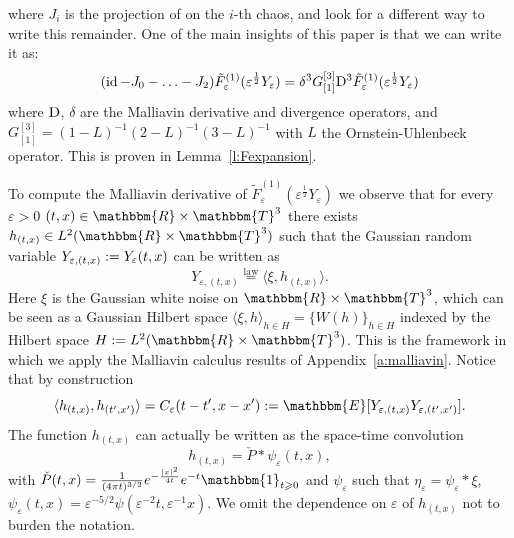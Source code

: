 where $J_i$ is the projection of on the $i$-th chaos, and look for a different
way to write this remainder. One of the main insights of this paper is that we
can write it as:
\[ (\operatorname{id} - J_0 - \ldots - J_2) \tilde{F}^{(1)}_{\varepsilon}
   (\varepsilon^{\frac{1}{2}} Y_{\varepsilon}) = \delta^3 G_{[1]}^{[3]}
   \mathrm{D}^3  \tilde{F}^{(1)}_{\varepsilon} (\varepsilon^{\frac{1}{2}}
   Y_{\varepsilon}) \]
where $\mathrm{D}$, $\delta$ are the Malliavin derivative and divergence
operators, and $G_{[1]}^{[3]} = (1 - L)^{- 1} (2 - L)^{- 1} (3 - L)^{- 1}$
with $L$ the Ornstein-Uhlenbeck operator. This is proven in
Lemma~\ref{l:Fexpansion}.

To compute the Malliavin derivative of $\tilde{F}^{(1)}_{\varepsilon}
(\varepsilon^{\frac{1}{2}} Y_{\varepsilon})$ we observe that for every
$\varepsilon > 0$ $(t, x) \in \mathbbm{R} \times \mathbbm{T}^3$ there exists
$h_{(t, x)} \in L^2 (\mathbbm{R} \times \mathbbm{T}^3)$ such that the Gaussian
random variable $Y_{\varepsilon, (t, x)} := Y_{\varepsilon} (t, x)$ can
be written as
\begin{equation}
  Y_{\varepsilon, (t, x)} \overset{\text{law}}{=} \langle \xi, h_{(t, x)}
  \rangle . \label{e:Y-law-equiv}
\end{equation}
Here $\xi$ is the Gaussian white noise on $\mathbbm{R} \times \mathbbm{T}^3$,
which can be seen as a Gaussian Hilbert space $\langle \xi, h \rangle_{h \in
H} = \{ W (h) \}_{h \in H}$ indexed by the Hilbert space $H \assign L^2
(\mathbbm{R} \times \mathbbm{T}^3)$. This is the framework in which we apply
the Malliavin calculus results of Appendix~\ref{a:malliavin}. Notice that by
construction
\begin{equation}
  \langle h_{(t, x)}, h_{(t', x')} \rangle = C_{\varepsilon} (t - t', x - x')
  \assign \mathbbm{E} [Y_{\varepsilon, (t, x)} Y_{\varepsilon, (t', x')}] .
  \label{e:covariance-h}
\end{equation}
The function $h_{(t, x)}$ can actually be written as the space-time
convolution
\[ h_{(t, x)} = \check{P} \ast \psi_{\varepsilon} (t, x), \]
with $\check{P} (t, x) = \frac{1}{(4 \mathpi t)^{3 / 2}} e^{- \frac{| x |^2}{4
t}} e^{- t}  \mathbbm{1}_{t \geqslant 0}$ and $\psi_{\varepsilon}$ such that
$\eta_{\varepsilon} = \psi_{\varepsilon} \ast \xi$, $\psi_{\varepsilon} (t, x)
= \varepsilon^{- 5 / 2} \psi (\varepsilon^{- 2} t, \varepsilon^{- 1} x)$. We
omit the dependence on $\varepsilon$ of $h_{(t, x)}$ not to burden the
notation.

